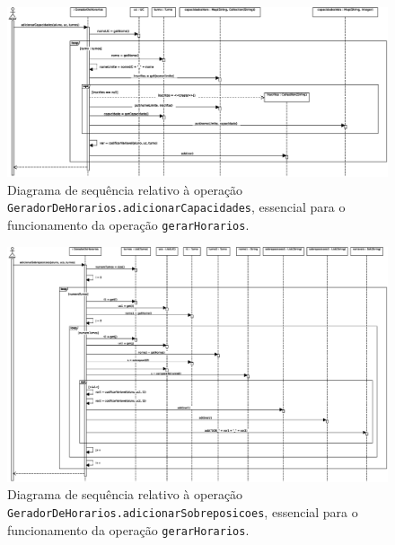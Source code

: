 \documentclass[12pt, a4paper]{article}
\begin{document}
\begin{landscape}
        \vspace*{\fill}
        \pagebreak
        \vspace*{\fill}

        \begin{figure}[H]
            \centering
            \includegraphics[scale=0.70]{Imagens/Modelos/gerarHorariosAdicionarCapacidades.svg.eps}
            \caption{
                Diagrama de sequência relativo à operação \texttt{GeradorDeHorarios.adicionarCapacidades},
                essencial para o funcionamento da operação \texttt{gerarHorarios}.
            }
        \end{figure}

        \vspace*{\fill}
        \pagebreak
        \vspace*{\fill}

        \begin{figure}[H]
            \centering
            \includegraphics[scale=0.60]{Imagens/Modelos/gerarHorariosAdicionarSobreposicoes.svg.eps}
            \caption{
                Diagrama de sequência relativo à operação \texttt{GeradorDeHorarios.adicionarSobreposicoes},
                essencial para o funcionamento da operação \texttt{gerarHorarios}.
            }
        \end{figure}


\end{landscape}
\end{document}
